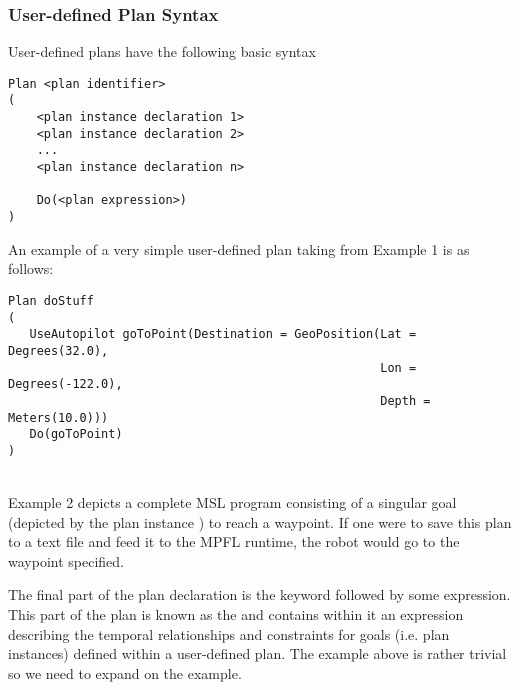 \subsubsection{User-defined Plan Syntax}
User-defined plans have the following basic syntax
\begin{verbatim}
Plan <plan identifier>
(
    <plan instance declaration 1>
    <plan instance declaration 2>
    ...
    <plan instance declaration n>
    
    Do(<plan expression>)
)
\end{verbatim}

An example of a very simple user-defined plan taking from Example 1 is as follows:
\begin{verbatim}
Plan doStuff
(
   UseAutopilot goToPoint(Destination = GeoPosition(Lat = Degrees(32.0),
                                                    Lon = Degrees(-122.0),
                                                    Depth = Meters(10.0)))   
   Do(goToPoint)                                       
)
\end{verbatim}
\\

Example 2 depicts a complete MSL program consisting of a singular goal (depicted by the  plan instance ) to reach a waypoint. If one were to save this plan to a text file and feed it to the MPFL runtime, the robot would go to the waypoint specified. 

The final part of the plan declaration is the keyword  followed by some expression. This part of the plan is known as the  and contains within it an expression describing the temporal relationships and constraints for goals (i.e. plan instances) defined within a user-defined plan. The example above is rather trivial so we need to expand on the example.


